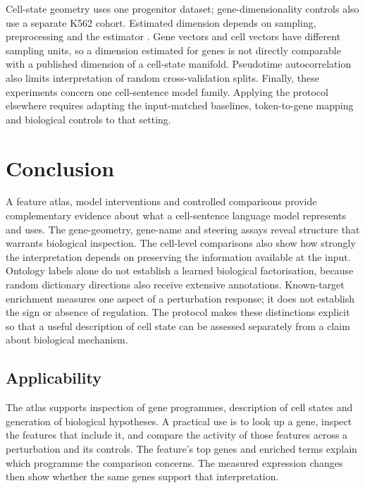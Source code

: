 \documentclass[review,authoryear,12pt]{elsarticle}
\begin{document}
Cell-state geometry uses one progenitor dataset; gene-dimensionality controls also use a separate
K562 cohort. Estimated dimension depends on sampling,
preprocessing and the estimator \citep{refSingleCellID}. Gene vectors and cell vectors have different
sampling units, so a dimension estimated for genes is not directly comparable with a published
dimension of a cell-state manifold. Pseudotime autocorrelation also limits interpretation of random
cross-validation splits. Finally, these experiments concern one cell-sentence model family.
Applying the protocol elsewhere requires adapting the input-matched baselines, token-to-gene mapping
and biological controls to that setting.

\section{Conclusion}

A feature atlas, model interventions and controlled comparisons provide complementary evidence about
what a cell-sentence language model represents and uses. The gene-geometry, gene-name and steering
assays reveal structure that warrants biological inspection. The cell-level comparisons also show
how strongly the interpretation depends on preserving the information available at the input.
Ontology labels alone do not establish a learned biological factorisation, because random
dictionary directions also receive extensive annotations.
Known-target enrichment measures one aspect of a perturbation response; it does not establish the
sign or absence of regulation. The protocol makes these distinctions explicit so that a useful
description of cell state can be assessed separately from a claim about biological mechanism.

\subsection{Applicability}

The atlas supports inspection of gene programmes, description of cell states and generation of
biological hypotheses. A practical use is to look up a gene, inspect the features that include it,
and compare the activity of those features across a perturbation and its controls. The feature's
top genes and enriched terms explain which programme the comparison concerns. The measured
expression changes then show whether the same genes support that interpretation.
\end{document}
